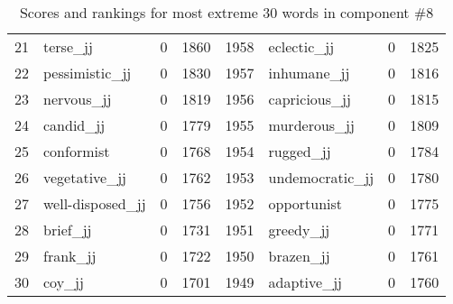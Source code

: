 \begin{table}[tbp]
\begin{tabular}{| rlr@{.}l | rlr@{.}l |}
    21 & terse\_jj & 0 & 1860    &    1958 & eclectic\_jj & 0 & 1825 \\
    22 & pessimistic\_jj & 0 & 1830    &    1957 & inhumane\_jj & 0 & 1816 \\
    23 & nervous\_jj & 0 & 1819    &    1956 & capricious\_jj & 0 & 1815 \\
    24 & candid\_jj & 0 & 1779    &    1955 & murderous\_jj & 0 & 1809 \\
    25 & conformist & 0 & 1768    &    1954 & rugged\_jj & 0 & 1784 \\
    26 & vegetative\_jj & 0 & 1762    &    1953 & undemocratic\_jj & 0 & 1780 \\
    27 & well-disposed\_jj & 0 & 1756    &    1952 & opportunist & 0 & 1775 \\
    28 & brief\_jj & 0 & 1731    &    1951 & greedy\_jj & 0 & 1771 \\
    29 & frank\_jj & 0 & 1722    &    1950 & brazen\_jj & 0 & 1761 \\
    30 & coy\_jj & 0 & 1701    &    1949 & adaptive\_jj & 0 & 1760 \\
    \hline
    \end{tabular}
    \caption{Scores and rankings for most extreme 30 words in component \#8} 
\end{table}
\clearpage
